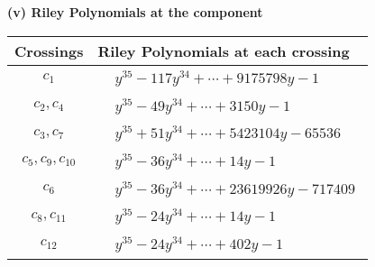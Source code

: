 \documentclass[1p]{elsarticle_modified}
\theoremstyle{definition}
\begin{document}
\flushleft \textbf{(v) Riley Polynomials at the component}\newline \\
\begin{tabular}{m{50pt}|m{274pt}}
Crossings & \hspace{64pt}Riley Polynomials at each crossing \\
\hline $$\begin{aligned}c_{1}\end{aligned}$$&$\begin{aligned}
&y^{35}-117 y^{34}+\cdots+9175798 y-1
\end{aligned}$\\
\hline $$\begin{aligned}c_{2},c_{4}\end{aligned}$$&$\begin{aligned}
&y^{35}-49 y^{34}+\cdots+3150 y-1
\end{aligned}$\\
\hline $$\begin{aligned}c_{3},c_{7}\end{aligned}$$&$\begin{aligned}
&y^{35}+51 y^{34}+\cdots+5423104 y-65536
\end{aligned}$\\
\hline $$\begin{aligned}c_{5},c_{9},c_{10}\end{aligned}$$&$\begin{aligned}
&y^{35}-36 y^{34}+\cdots+14 y-1
\end{aligned}$\\
\hline $$\begin{aligned}c_{6}\end{aligned}$$&$\begin{aligned}
&y^{35}-36 y^{34}+\cdots+23619926 y-717409
\end{aligned}$\\
\hline $$\begin{aligned}c_{8},c_{11}\end{aligned}$$&$\begin{aligned}
&y^{35}-24 y^{34}+\cdots+14 y-1
\end{aligned}$\\
\hline $$\begin{aligned}c_{12}\end{aligned}$$&$\begin{aligned}
&y^{35}-24 y^{34}+\cdots+402 y-1
\end{aligned}$\\
\hline
\end{tabular}\\~\\
\end{document}
